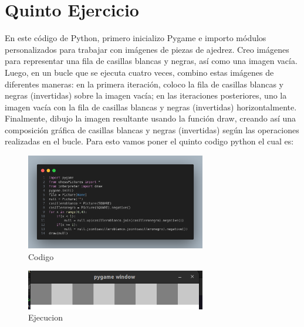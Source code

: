 \documentclass[10pt, a4paper]{article}
\begin{document}
\section{Quinto Ejercicio}
En este código de Python, primero inicializo Pygame e importo módulos personalizados para trabajar con imágenes de piezas de ajedrez. Creo imágenes para representar una fila de casillas blancas y negras, así como una imagen vacía. Luego, en un bucle que se ejecuta cuatro veces, combino estas imágenes de diferentes maneras: en la primera iteración, coloco la fila de casillas blancas y negras (invertidas) sobre la imagen vacía; en las iteraciones posteriores, uno la imagen vacía con la fila de casillas blancas y negras (invertidas) horizontalmente. Finalmente, dibujo la imagen resultante usando la función draw, creando así una composición gráfica de casillas blancas y negras (invertidas) según las operaciones realizadas en el bucle.
\singlespacing
Para esto vamos poner el quinto codigo python el cual es:  
\begin{figure}[H]
  \centering
  \includegraphics[width=0.7\textwidth]{img/Ej5.png}
  \caption{Codigo}
\end{figure}

\begin{figure}[H]
  \centering
  \includegraphics[width=0.7\textwidth]{img/Ejercicio5.png}
  \caption{Ejecucion}
\end{figure}
\end{document}
